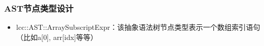 \begin{frame}
    \frametitle{AST节点类型设计}
    \footnotesize
    \begin{itemize}
        \item {lcc::AST::ArraySubscriptExpr：该抽象语法树节点类型表示一个数组索引语句（比如a[0], arr[idx]等等）}
    \end{itemize}
\end{frame}
